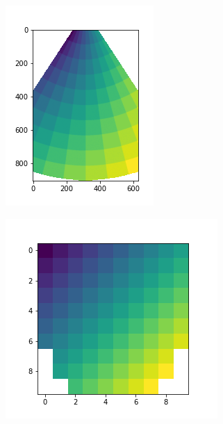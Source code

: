 \documentclass[11pt]{article} %
\begin{document}
	\begin{figure}
	\centering
		\begin{subfigure}{0.29\textwidth}
		\includegraphics[width=\textwidth]{figuras/polar_original.png}
		\caption{}
		\end{subfigure}
		\begin{subfigure}{0.35\textwidth}
		\includegraphics[width=\textwidth]{figuras/polar_new.png}

\end{subfigure}
\end{figure}
\end{document}
